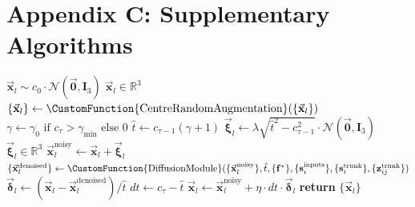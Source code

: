 \section*{Appendix C: Supplementary Algorithms}
\begin{suppalgorithm}
     \caption{\textbf{Sample Diffusion}\\ A faithful recreation of the diffusion sampling algorithm from the AlphaFold~3 paper \cite{af3}. Diffusion in AlphaFold~3 closely follows the diffusion models described in \cite{edm_diffusion}. In particular, the noise level is increased in each denoising iteration, before the actual denoising step. }
     {\small
     \begin{algorithmic}[1]
         \State $\vec{\mathbf{x}}_l \sim c_0 \cdot \mathcal{N}(\vec{\mathbf{0}}, \mathbf{I}_3)$ \hfill $\vec{\mathbf{x}}_l \in \mathbb{R}^3$
             \State $\{\vec{\mathbf{x}}_l\} \gets \CustomFunction{\text{CentreRandomAugmentation}}(\{\vec{\mathbf{x}}_l\})$
             \State $\gamma \gets \gamma_0 \text{ if } c_\tau > \gamma_{\min} \text{ else } 0$
             \State $\hat{t} \gets c_{\tau-1}(\gamma + 1)$
             \State $\vec{\boldsymbol{\xi}}_l \gets \lambda \sqrt{\hat{t}^2 - c_{\tau-1}^2} \cdot \mathcal{N}(\vec{\mathbf{0}}, \mathbf{I}_3)$ \hfill $\vec{\boldsymbol{\xi}}_l \in \mathbb{R}^3$
             \State $\vec{\mathbf{x}}_l^{\text{noisy}} \gets \vec{\mathbf{x}}_l + \vec{\boldsymbol{\xi}}_l$
             \State $\{\vec{\mathbf{x}}_l^{\text{denoised}}\} \gets \CustomFunction{\text{DiffusionModule}}(\{\vec{\mathbf{x}}_l^{\text{noisy}}\}, \hat{t}, \{\mathbf{f}^*\}, \{\mathbf{s}_i^{\text{inputs}}\}, \{\mathbf{s}_i^{\text{trunk}}\}, \{\mathbf{z}_{ij}^{\text{trunk}}\})$
             \State $\vec{\boldsymbol{\delta}}_l \gets (\vec{\mathbf{x}}_l - \vec{\mathbf{x}}_l^{\text{denoised}})/\hat{t}$
             \State $dt \gets c_\tau - \hat{t}$
             \State $\vec{\mathbf{x}}_l \gets \vec{\mathbf{x}}_l^{\text{noisy}} + \eta \cdot dt \cdot \vec{\boldsymbol{\delta}}_l$
         \EndFor
         \State \textbf{return} $\{\vec{\mathbf{x}}_l\}$
         \end{algorithmic}
     }
     \label{alg:af3_diffusion}
\end{suppalgorithm}

